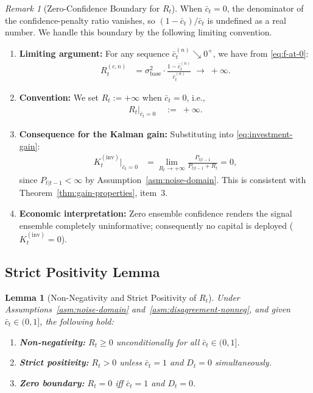 \documentclass[12pt,openany]{book}
\numberwithin{equation}{chapter}
\theoremstyle{plain}
\newtheorem{lemma}[theorem]{Lemma}
\theoremstyle{definition}
\theoremstyle{remark}
\newtheorem{remark}[theorem]{Remark}
\begin{document}
\begin{remark}[Zero-Confidence Boundary for $R_t$]
\label{rem:zero-confidence-noise}
When $\bar{c}_t = 0$, the denominator of the confidence-penalty
ratio vanishes, so $(1-\bar{c}_t)/\bar{c}_t$ is undefined as a
real number.  We handle this boundary by the following
limiting convention.
\begin{enumerate}
  \item \textbf{Limiting argument:}
        For any sequence $\bar{c}_t^{(n)} \searrow 0^+$, we
        have from \eqref{eq:f-at-0}:
        \begin{align}
          R_t^{(c,n)}
          &= \sigma_{\mathrm{base}}^2
             \cdot \frac{1 - \bar{c}_t^{(n)}}{\bar{c}_t^{(n)}}
           \;\longrightarrow\; +\infty.
          \label{eq:R-diverges}
        \end{align}
  \item \textbf{Convention:}
        We set $R_t := +\infty$ when $\bar{c}_t = 0$, i.e.,
        \begin{align}
          R_t\big|_{\bar{c}_t=0}
          &\;:=\; +\infty.
          \label{eq:R-convention}
        \end{align}
  \item \textbf{Consequence for the Kalman gain:}
        Substituting into \eqref{eq:investment-gain}:
        \begin{align}
          K_t^{(\mathrm{inv})}\big|_{\bar{c}_t=0}
          &= \lim_{R_t \to +\infty}
             \frac{P_{t|t-1}}{P_{t|t-1} + R_t}
           = 0,
          \label{eq:gain-zero-confidence-1}
        \end{align}
        since $P_{t|t-1} < \infty$ by
        Assumption~\ref{asm:noise-domain}.  This is consistent
        with Theorem~\ref{thm:gain-properties}, item~3.
  \item \textbf{Economic interpretation:}
        Zero ensemble confidence renders the signal ensemble
        completely uninformative; consequently no capital is
        deployed ($K_t^{(\mathrm{inv})} = 0$).
\end{enumerate}
\end{remark}

\subsection{Strict Positivity Lemma}

\begin{lemma}[Non-Negativity and Strict Positivity of $R_t$]
\label{lem:noise-positive}
Under Assumptions~\ref{asm:noise-domain}
and~\ref{asm:disagreement-nonneg}, and given
$\bar{c}_t \in (0,1]$, the following hold:
\begin{enumerate}
  \item \textbf{Non-negativity:}
        $R_t \geq 0$ unconditionally for all
        $\bar{c}_t \in (0,1]$.
  \item \textbf{Strict positivity:}
        $R_t > 0$ unless $\bar{c}_t = 1$ and $D_t = 0$
        simultaneously.
  \item \textbf{Zero boundary:}
        $R_t = 0$ iff $\bar{c}_t = 1$ \emph{and} $D_t = 0$.
\end{enumerate}
\end{lemma}
\end{document}
